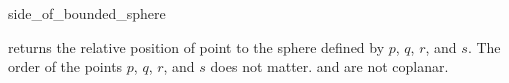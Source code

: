 \begin{ccRefFunction}{side_of_bounded_sphere}

         {returns the relative position of point 
          to the sphere defined by $p$, $q$, $r$, and $s$. The order
          of the points $p$, $q$, $r$, and $s$ does not matter.
          \ccPrecond {} and  are not coplanar.}
\end{ccRefFunction}

